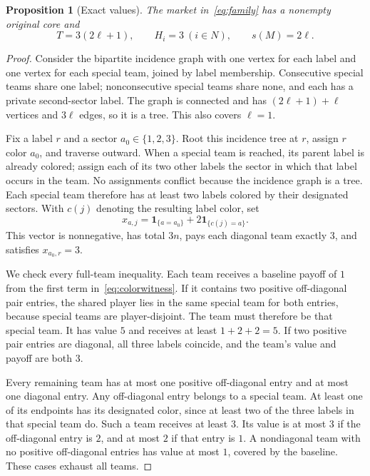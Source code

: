 \documentclass[11pt]{article}
\newtheorem{proposition}[theorem]{Proposition}
\theoremstyle{remark}
\newcommand{\one}{\mathbf 1}
\begin{document}
\begin{proposition}[Exact values]\label{prop:family}
The market in~\eqref{eq:family} has a nonempty original core and
\begin{equation}\label{eq:familyvalues}
            T=3(2\ell+1),\qquad H_i=3\ (i\in N),\qquad s(M)=2\ell.
\end{equation}
\end{proposition}
\begin{proof}
Consider the bipartite incidence graph with one vertex for each label
and one vertex for each special team, joined by label membership.
Consecutive special teams share one label; nonconsecutive special teams
share none, and each has a private second-sector label. The graph is
connected and has $(2\ell+1)+\ell$ vertices and $3\ell$ edges, so it
is a tree. This also covers $\ell=1$.

Fix a label $r$ and a sector $a_0\in\{1,2,3\}$. Root this incidence
tree at $r$, assign $r$ color $a_0$, and traverse outward. When a special
team is reached, its parent label is already colored; assign each of its
two other labels the sector in which that label occurs in the team.
No assignments conflict because the incidence graph is a tree. Each
special team therefore has at least two labels colored by their designated
sectors. With $c(j)$ denoting the resulting label color, set
\begin{equation}\label{eq:colorwitness}
           x_{a,j}=\one_{\{a=a_0\}}+2\one_{\{c(j)=a\}}.
\end{equation}
This vector is nonnegative, has total $3n$, pays each diagonal team
exactly $3$, and satisfies $x_{a_0,r}=3$.

We check every full-team inequality. Each team receives a baseline payoff
of $1$ from the first term in~\eqref{eq:colorwitness}. If it contains two
positive off-diagonal pair entries, the shared player lies in the same
special team for both entries, because special teams are player-disjoint.
The team must therefore be that special team. It has value $5$ and receives
at least $1+2+2=5$. If two positive pair entries are diagonal, all three
labels coincide, and the team's value and payoff are both $3$.

Every remaining team has at most one positive off-diagonal entry and at
most one diagonal entry. Any off-diagonal entry belongs to a special team.
At least one of its endpoints has its designated color, since at least two
of the three labels in that special team do. Such a team receives at least
$3$. Its value is at most $3$ if the off-diagonal entry is $2$, and at
most $2$ if that entry is $1$. A nondiagonal team with no positive
off-diagonal entries has value at most $1$, covered by the baseline.
These cases exhaust all teams.


\end{proof}
\end{document}
